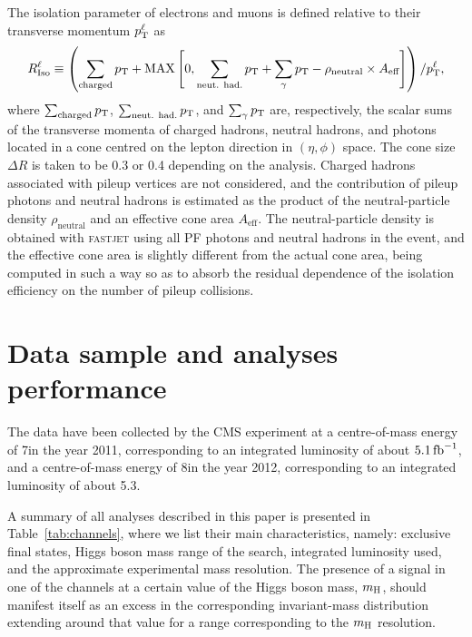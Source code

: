 \documentclass[12pt,twoside,a4paper,cmspaper,final,collab]{cms-tdr}
\begin{document}
The isolation parameter of electrons and muons is defined relative to their transverse momentum $p_{\mathrm{T}}^{\ell}$ as
\begin{equation}
R_\text{Iso}^{\ell} \equiv \left( \sum_\text{charged}  p_{\mathrm{T}} + \mathrm{MAX}\left[ 0, \sum_\text{neut. had.}  p_{\mathrm{T}}
                                        +  \sum_{\gamma}  {p_{\mathrm{T}}} - \rho_\text{neutral} \times A_\text{eff}  \right] \right) /  p_{\mathrm{T}}^{\ell},
\label{eq:reconstruction_isolation}
\end{equation}
where $\sum_\text{charged}  p_{\mathrm{T}}$, $\sum_\text{neut. had.}  p_{\mathrm{T}}$, and $\sum_{\gamma} p_{\mathrm{T}}$ are, respectively, the scalar sums of the transverse momenta of charged hadrons, neutral hadrons, and photons located in a cone centred on the lepton direction in $(\eta, \phi)$ space.
The cone size $\Delta R$ is taken to be 0.3 or 0.4 depending on the analysis.
Charged hadrons associated with pileup vertices are not considered, and the contribution of pileup
photons and neutral hadrons is estimated as the product of the neutral-particle \PT density  $\rho_\text{neutral}$ and an effective cone area $A_\text{eff}$.
The neutral-particle \PT density is obtained with \textsc{fastjet} using all PF photons and neutral hadrons in the event, and the effective cone area is slightly different from the actual cone area,
being computed in such a way so as to absorb the residual dependence of the isolation efficiency on the number of pileup collisions.





\section{Data sample and analyses performance}\label{sec:searches}


The data have been collected by the CMS experiment at a centre-of-mass energy
of 7\TeV in the year 2011, corresponding to
an integrated  luminosity of about $5.1\mbox{\ensuremath{\,\text{fb}^\text{$-$1}}}$,  and a centre-of-mass
energy of 8\TeV in the year 2012, corresponding to
an integrated luminosity of about 5.3\fbinv.

A summary of all analyses described in this paper
is presented in Table~\ref{tab:channels}, where we list their main characteristics, namely:
exclusive final states, Higgs boson mass range of the search,
integrated luminosity used, and the approximate experimental mass resolution.
The presence of a signal in one of the channels
at a certain value of the Higgs boson mass, $m_{\mathrm{H}}$, should manifest itself as an excess
in the corresponding invariant-mass distribution extending around that value for a range corresponding to the $m_{\mathrm{H}}$ resolution.
\end{document}
